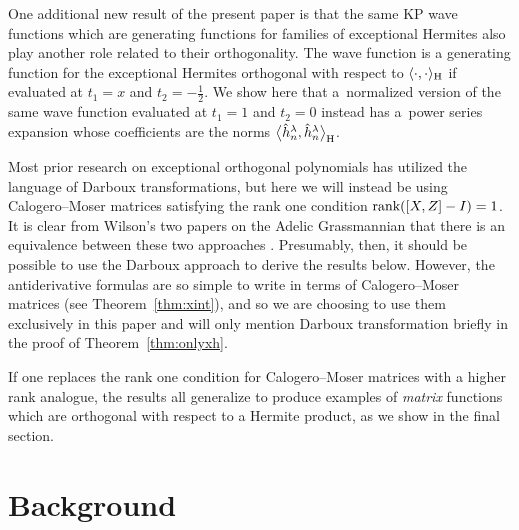 \documentclass[pdftex]{sigma}
\numberwithin{equation}{section}
\theoremstyle{definition}
\begin{document}
One additional new result of the present paper is that the same KP wave
functions which are generating functions for families of exceptional
Hermites also play another role related to their orthogonality.
The wave function is a generating function for the exceptional
Hermites orthogonal with respect to $\langle\cdot,\cdot\rangle_{\rm H}$ if
evaluated at $t_1=x$ and $t_2=-\tfrac{1}{2}$.
We show here that a~normalized version of the same wave function
 evaluated at $t_1=1$ and $t_2=0$ instead
 has a~power series expansion whose coefficients are the norms $\big\langle \hat
 h_n^\lambda,\hat h_n^\lambda\big\rangle_{\rm H}$.

Most prior research on exceptional orthogonal polynomials has utilized the language of
Darboux transformations, but here we will instead be using Calogero--Moser matrices
satisfying the rank one condition $\hbox{rank}([X,Z]-I)=1$.
It is clear from Wilson’s two papers on the Adelic Grassmannian that there is
an equivalence between these two approaches \cite{WilsonBisp,WilsonCM}. Presumably, then, it should be possible to
use the Darboux approach to derive the results below. However, the antiderivative formulas are so
simple to write in terms of Calogero--Moser matrices (see Theorem~\ref{thm:xint}), and so we are choosing to use
them exclusively in this paper and will only mention Darboux transformation briefly in the proof of Theorem~\ref{thm:onlyxh}.

If one replaces the rank one
 condition for Calogero--Moser matrices with a higher rank analogue, the results all generalize
to produce examples of \textit{matrix} functions which are
 orthogonal with respect to a Hermite product, as we show in the final section.

\section{Background}
\end{document}
